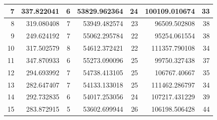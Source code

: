 \begin{table}
\begin{adjustwidth}{}{}
{{\begin{tabular}{|r|r|r|r|r|r|r|}
\hline
7                                          & 337.822041                   & 6                                     & 53829.962364                   & 24                                    & 100109.010674                & 33                                     \\ 
\hline
8                                          & 319.080408                   & 7                                     & 53949.482574                   & 23                                    & 96509.502808                 & 38                                     \\ 
\hline
9                                          & 249.624192                   & 7                                     & 55062.295784                   & 22                                    & 95254.061554                 & 38                                     \\ 
\hline
10                                         & 317.502579                   & 8                                     & 54612.372421                   & 22                                    & 111357.790108                & 34                                     \\ 
\hline
11                                         & 347.870933                   & 6                                     & 55273.090096                   & 25                                    & 99750.327438                 & 37                                     \\ 
\hline
12                                         & 294.693992                   & 7                                     & 54738.413105                   & 25                                    & 106767.40667                 & 35                                     \\ 
\hline
13                                         & 282.647407                   & 7                                     & 54133.133018                   & 25                                    & 111462.286797                & 34                                     \\ 
\hline
14                                         & 292.732835                   & 6                                     & 54017.253056                   & 24                                    & 107217.431229                & 39                                     \\ 
\hline
15                                         & 283.872915                   & 5                                     & 53602.699944                   & 26                                    & 106198.506428                & 44                                     \\ 

\end{tabular}}}
\end{adjustwidth}
\end{table}
